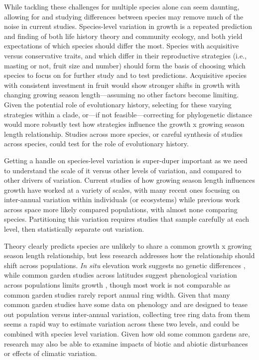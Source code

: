 \documentclass[11pt]{article}
\begin{document}
While tackling these challenges for multiple species alone can seem daunting, allowing for and studying differences between species may remove much of the noise in current studies. Species-level variation in growth is a repeated prediction and finding of both life history theory and community ecology, and both yield expectations of which species should differ the most. Species with acquisitive versus conservative traits, and which differ in their reproductive strategies (i.e., masting or not, fruit size and number) should form the basis of choosing which species to focus on for further study and to test predictions. Acquisitive species with consistent investment in fruit would show stronger shifts in growth with changing growing season length---assuming no other factors become limiting. Given the potential role of evolutionary history, selecting for these varying strategies within a clade, or---if not feasible---correcting for phylogenetic distance would more robustly test how strategies influence the growth x growing season length relationship. Studies across more species, or careful synthesis of studies across species, could test for the role of evolutionary history.

Getting a handle on species-level variation is super-duper important as we need to understand the scale of it versus other levels of variation, and compared to other drivers of variation. Current studies of how growing season length influences growth have worked at a variety of scales, with many recent ones focusing on inter-annual variation within individuals (or ecosystems) while previous work across space more likely compared populations, with almost none comparing species. Partitioning this variation requires studies that sample carefully at each level, then statistically separate out variation. 

Theory clearly predicts species are unlikely to share a common growth x growing season length relationship, but less research addresses how the relationship should shift across populations. \emph{In situ} elevation work suggests no genetic differences \citep{king2013tree}, while common garden studies across latitudes suggest phenological variation across populations limits growth \citep{soolanayakanahally2013timing}, though most work is not comparable as common garden studies rarely report annual ring width. Given that many common garden studies have some data on phenology and are designed to tease out population versus inter-annual variation, collecting tree ring data from them seems a rapid way to estimate variation across these two levels, and could be combined with species level variation. Given how old some common gardens are, research may also be able to examine impacts of biotic and abiotic disturbances or effects of climatic variation.
\end{document}
